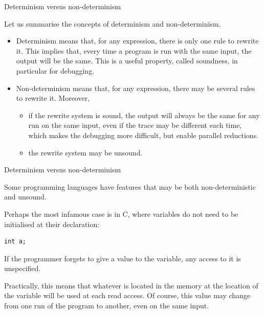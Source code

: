 \documentclass[compress,dvipdfmx]{beamer}
\begin{document}
%
\begin{frame}{Determinism versus non-determinism}

  Let us summarise the concepts of determinism and
  non\hyp{}determinism.
  \begin{itemize}

    \item Determinism means that, for any expression, there is only
      one rule to rewrite it. This implies that, every time a program
      is run with the same input, the output will be the same. This is
      a useful property, called soundness, in particular for
      debugging.

    \item Non-determinism means that, for any expression, there may be
      several rules to rewrite it. Moreover,
      \begin{itemize}

         \item if the rewrite system is sound, the output will always
           be the same for any run on the same input, even if the
           trace may be different each time, which makes the debugging
           more difficult, but enable parallel reductions.

         \item the rewrite system may be unsound.

      \end{itemize}
  \end{itemize}

\end{frame}

%
\begin{frame}[fragile]{Determinism versus non-determinism}

  Some programming languages have features that may be both
  non\hyp{}deterministic and unsound.

  \bigskip

  Perhaps the most infamous case is in C, where variables do not need
  to be initialised at their declaration:
{\small
\begin{verbatim}
int a;
\end{verbatim}
}
  If the programmer forgets to give a value to the variable, any access
  to it is unspecified.

  \bigskip

  Practically, this means that whatever is located in the memory at
  the location of the variable will be used at each read access. Of
  course, this value may change from one run of the program to
  another, even on the same input.

\end{frame}
\end{document}
